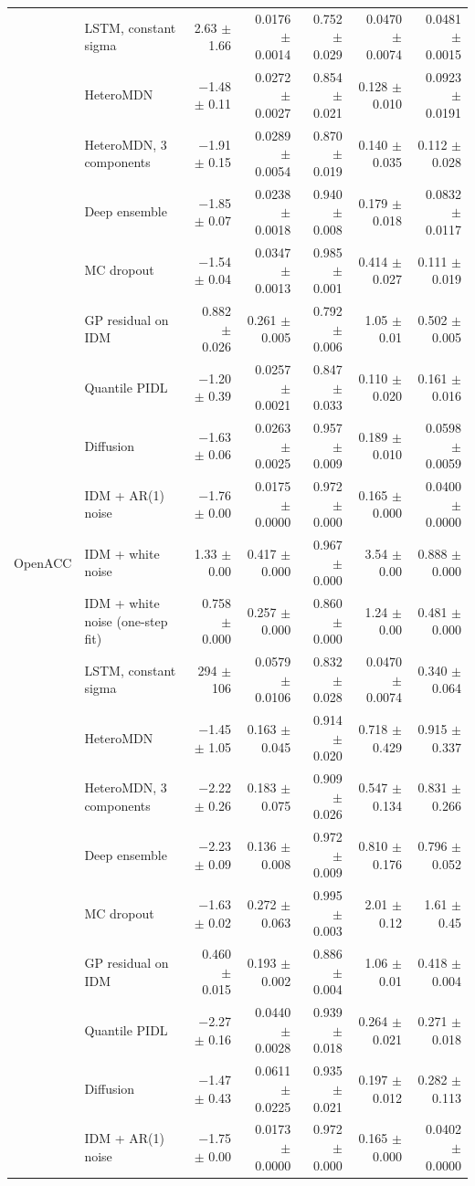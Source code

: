 \begin{longtable}{llrrrrr}
 & LSTM, constant sigma & 2.63 $\pm$ 1.66 & 0.0176 $\pm$ 0.0014 & 0.752 $\pm$ 0.029 & 0.0470 $\pm$ 0.0074 & 0.0481 $\pm$ 0.0015 \\
 & HeteroMDN & $-$1.48 $\pm$ 0.11 & 0.0272 $\pm$ 0.0027 & 0.854 $\pm$ 0.021 & 0.128 $\pm$ 0.010 & 0.0923 $\pm$ 0.0191 \\
 & HeteroMDN, 3 components & $-$1.91 $\pm$ 0.15 & 0.0289 $\pm$ 0.0054 & 0.870 $\pm$ 0.019 & 0.140 $\pm$ 0.035 & 0.112 $\pm$ 0.028 \\
 & Deep ensemble & $-$1.85 $\pm$ 0.07 & 0.0238 $\pm$ 0.0018 & 0.940 $\pm$ 0.008 & 0.179 $\pm$ 0.018 & 0.0832 $\pm$ 0.0117 \\
 & MC dropout & $-$1.54 $\pm$ 0.04 & 0.0347 $\pm$ 0.0013 & 0.985 $\pm$ 0.001 & 0.414 $\pm$ 0.027 & 0.111 $\pm$ 0.019 \\
 & GP residual on IDM & 0.882 $\pm$ 0.026 & 0.261 $\pm$ 0.005 & 0.792 $\pm$ 0.006 & 1.05 $\pm$ 0.01 & 0.502 $\pm$ 0.005 \\
 & Quantile PIDL & $-$1.20 $\pm$ 0.39 & 0.0257 $\pm$ 0.0021 & 0.847 $\pm$ 0.033 & 0.110 $\pm$ 0.020 & 0.161 $\pm$ 0.016 \\
 & Diffusion & $-$1.63 $\pm$ 0.06 & 0.0263 $\pm$ 0.0025 & 0.957 $\pm$ 0.009 & 0.189 $\pm$ 0.010 & 0.0598 $\pm$ 0.0059 \\
 & IDM + AR(1) noise & $-$1.76 $\pm$ 0.00 & 0.0175 $\pm$ 0.0000 & 0.972 $\pm$ 0.000 & 0.165 $\pm$ 0.000 & 0.0400 $\pm$ 0.0000 \\
\midrule
OpenACC & IDM + white noise & 1.33 $\pm$ 0.00 & 0.417 $\pm$ 0.000 & 0.967 $\pm$ 0.000 & 3.54 $\pm$ 0.00 & 0.888 $\pm$ 0.000 \\
 & IDM + white noise (one-step fit) & 0.758 $\pm$ 0.000 & 0.257 $\pm$ 0.000 & 0.860 $\pm$ 0.000 & 1.24 $\pm$ 0.00 & 0.481 $\pm$ 0.000 \\
 & LSTM, constant sigma & 294 $\pm$ 106 & 0.0579 $\pm$ 0.0106 & 0.832 $\pm$ 0.028 & 0.0470 $\pm$ 0.0074 & 0.340 $\pm$ 0.064 \\
 & HeteroMDN & $-$1.45 $\pm$ 1.05 & 0.163 $\pm$ 0.045 & 0.914 $\pm$ 0.020 & 0.718 $\pm$ 0.429 & 0.915 $\pm$ 0.337 \\
 & HeteroMDN, 3 components & $-$2.22 $\pm$ 0.26 & 0.183 $\pm$ 0.075 & 0.909 $\pm$ 0.026 & 0.547 $\pm$ 0.134 & 0.831 $\pm$ 0.266 \\
 & Deep ensemble & $-$2.23 $\pm$ 0.09 & 0.136 $\pm$ 0.008 & 0.972 $\pm$ 0.009 & 0.810 $\pm$ 0.176 & 0.796 $\pm$ 0.052 \\
 & MC dropout & $-$1.63 $\pm$ 0.02 & 0.272 $\pm$ 0.063 & 0.995 $\pm$ 0.003 & 2.01 $\pm$ 0.12 & 1.61 $\pm$ 0.45 \\
 & GP residual on IDM & 0.460 $\pm$ 0.015 & 0.193 $\pm$ 0.002 & 0.886 $\pm$ 0.004 & 1.06 $\pm$ 0.01 & 0.418 $\pm$ 0.004 \\
 & Quantile PIDL & $-$2.27 $\pm$ 0.16 & 0.0440 $\pm$ 0.0028 & 0.939 $\pm$ 0.018 & 0.264 $\pm$ 0.021 & 0.271 $\pm$ 0.018 \\
 & Diffusion & $-$1.47 $\pm$ 0.43 & 0.0611 $\pm$ 0.0225 & 0.935 $\pm$ 0.021 & 0.197 $\pm$ 0.012 & 0.282 $\pm$ 0.113 \\
 & IDM + AR(1) noise & $-$1.75 $\pm$ 0.00 & 0.0173 $\pm$ 0.0000 & 0.972 $\pm$ 0.000 & 0.165 $\pm$ 0.000 & 0.0402 $\pm$ 0.0000 \\
\end{longtable}
\endgroup
